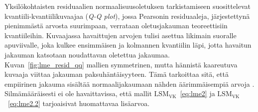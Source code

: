 \documentclass[finnish]{docopts}
\begin{document}
Yksilökohtaisten residuaalien normaalisuusoletuksen tarkistamiseen \cite{burzykowski13} suosittelevat kvantiili-kvantiilikuvaajaa (\textit{Q-Q plot}), jossa Pearsonin residuaaleja, järjestettynä pienimmästä arvosta suurimpaan, verrataan oletusjakauman teoreettisiin kvantiileihin. Kuvaajassa havaittujen arvojen tulisi asettua likimain suoralle apuviivalle, joka kulkee ensimmäisen ja kolmannen kvantiilin läpi, jotta havaitun jakauman katsotaan noudattavan oletettua jakaumaa.\\

Kuvan~\ref{fig:lme_resid_qq} mallien symmetrinen, mutta hännistä kaareutuva kuvaaja viittaa jakauman paksuhäntäisyyteen. Tämä tarkoittaa sitä, että empiirinen jakauma sisältää normaalijakaumaan nähden äärimmäisempiä arvoja \citep{pinheiro00}. Silmämääräisesti ei ole havaittavissa, että mallit $\text{LSM}_{\text{VK}}$~\ref{eq:lme2} ja $\text{LSM}_{\text{VK}}$~\ref{eq:lme2.2} tarjoaisivat huomattavaa lisäarvoa.\\
\end{document}
